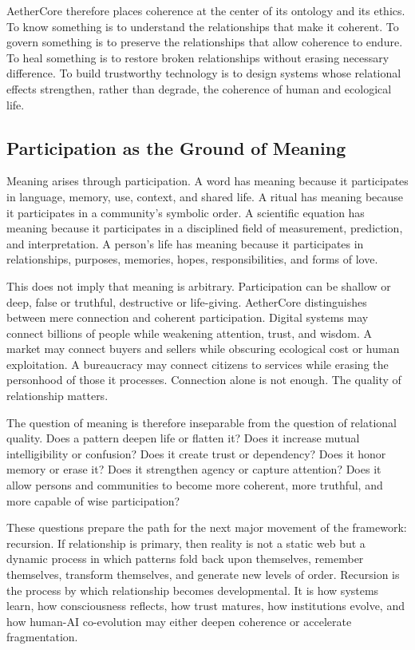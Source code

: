 \documentclass[12pt]{article}
\begin{document}
AetherCore therefore places coherence at the center of its ontology and its ethics. To know something is to understand the relationships that make it coherent. To govern something is to preserve the relationships that allow coherence to endure. To heal something is to restore broken relationships without erasing necessary difference. To build trustworthy technology is to design systems whose relational effects strengthen, rather than degrade, the coherence of human and ecological life.

\subsection{Participation as the Ground of Meaning}

Meaning arises through participation. A word has meaning because it participates in language, memory, use, context, and shared life. A ritual has meaning because it participates in a community's symbolic order. A scientific equation has meaning because it participates in a disciplined field of measurement, prediction, and interpretation. A person's life has meaning because it participates in relationships, purposes, memories, hopes, responsibilities, and forms of love.

This does not imply that meaning is arbitrary. Participation can be shallow or deep, false or truthful, destructive or life-giving. AetherCore distinguishes between mere connection and coherent participation. Digital systems may connect billions of people while weakening attention, trust, and wisdom. A market may connect buyers and sellers while obscuring ecological cost or human exploitation. A bureaucracy may connect citizens to services while erasing the personhood of those it processes. Connection alone is not enough. The quality of relationship matters.

The question of meaning is therefore inseparable from the question of relational quality. Does a pattern deepen life or flatten it? Does it increase mutual intelligibility or confusion? Does it create trust or dependency? Does it honor memory or erase it? Does it strengthen agency or capture attention? Does it allow persons and communities to become more coherent, more truthful, and more capable of wise participation?

These questions prepare the path for the next major movement of the framework: recursion. If relationship is primary, then reality is not a static web but a dynamic process in which patterns fold back upon themselves, remember themselves, transform themselves, and generate new levels of order. Recursion is the process by which relationship becomes developmental. It is how systems learn, how consciousness reflects, how trust matures, how institutions evolve, and how human-AI co-evolution may either deepen coherence or accelerate fragmentation.
\end{document}
